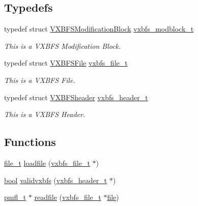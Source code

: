 \subsection*{Typedefs}
\begin{DoxyCompactItemize}
\item 
typedef struct \hyperlink{a00326}{V\+X\+B\+F\+S\+Modification\+Block} \hyperlink{a00200_a0774a42f7a124b6d3054ccabd4d35463_a0774a42f7a124b6d3054ccabd4d35463}{vxbfs\+\_\+modblock\+\_\+t}
\begin{DoxyCompactList}\small\item\em This is a V\+X\+B\+FS Modification Block. \end{DoxyCompactList}\item 
typedef struct \hyperlink{a00330}{V\+X\+B\+F\+S\+File} \hyperlink{a00200_abb93e2407af0d8fe0f5629ce6456c6f9_abb93e2407af0d8fe0f5629ce6456c6f9}{vxbfs\+\_\+file\+\_\+t}
\begin{DoxyCompactList}\small\item\em This is a V\+X\+B\+FS File. \end{DoxyCompactList}\item 
typedef struct \hyperlink{a00334}{V\+X\+B\+F\+Sheader} \hyperlink{a00200_ac5678b6d5dd5ed5ca86e5ccd4c30d39d_ac5678b6d5dd5ed5ca86e5ccd4c30d39d}{vxbfs\+\_\+header\+\_\+t}
\begin{DoxyCompactList}\small\item\em This is a V\+X\+B\+FS Header. \end{DoxyCompactList}\end{DoxyCompactItemize}
\subsection*{Functions}
\begin{DoxyCompactItemize}
\item 
\hyperlink{a00185_aa5445a6474a23ee3e7756d432dfa4ba1_aa5445a6474a23ee3e7756d432dfa4ba1}{file\+\_\+t} \hyperlink{a00200_a056a7e9a594275f19bd99150a92f266a_a056a7e9a594275f19bd99150a92f266a}{loadfile} (\hyperlink{a00200_abb93e2407af0d8fe0f5629ce6456c6f9_abb93e2407af0d8fe0f5629ce6456c6f9}{vxbfs\+\_\+file\+\_\+t} $\ast$)
\item 
\hyperlink{a00134_af6a258d8f3ee5206d682d799316314b1_af6a258d8f3ee5206d682d799316314b1}{bool} \hyperlink{a00200_a4d38ed022dd74a1ef381240419f8fd72_a4d38ed022dd74a1ef381240419f8fd72}{validvxbfs} (\hyperlink{a00200_ac5678b6d5dd5ed5ca86e5ccd4c30d39d_ac5678b6d5dd5ed5ca86e5ccd4c30d39d}{vxbfs\+\_\+header\+\_\+t} $\ast$)
\item 
\hyperlink{a00185_a02f7eedc7de6c770b6b29a62905fc61d_a02f7eedc7de6c770b6b29a62905fc61d}{pmfl\+\_\+t} $\ast$ \hyperlink{a00200_a092e5bdd19e8369aa33901fffeb1f025_a092e5bdd19e8369aa33901fffeb1f025}{readfile} (\hyperlink{a00200_abb93e2407af0d8fe0f5629ce6456c6f9_abb93e2407af0d8fe0f5629ce6456c6f9}{vxbfs\+\_\+file\+\_\+t} $\ast$\hyperlink{a00298}{file})
\end{DoxyCompactItemize}



